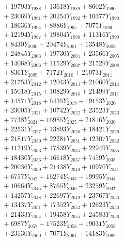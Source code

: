 \documentclass[a4paper,10pt]{article}
\begin{document}
{\begin{align}
&\;  + 19793 Y_{1988} + 13618 Y_{1989} + 8602 Y_{1990} \\[0.3ex]
&\;  + 23069 Y_{1991} + 20254 Y_{1992} + 10377 Y_{1993} \\[0.3ex]
&\;  + 18636 Y_{1994} + 8886 Y_{1995} + 7075 Y_{1996} \\[0.3ex]
&\;  + 12194 Y_{1997} + 19804 Y_{1998} + 11316 Y_{1999} \\[0.3ex]
&\;  + 8430 Y_{2000} + 20474 Y_{2001} + 13548 Y_{2002} \\[0.3ex]
&\;  + 24845 Y_{2003} + 19730 Y_{2004} + 23566 Y_{2005} \\[0.3ex]
&\;  + 14068 Y_{2006} + 11529 Y_{2007} + 21529 Y_{2008} \\[0.5ex]\allowbreak
&\;  + 8361 Y_{2009} + 7172 Y_{2010} + 21073 Y_{2011} \\[0.3ex]
&\;  + 21753 Y_{2012} + 12043 Y_{2013} + 21060 Y_{2014} \\[0.3ex]
&\;  + 15018 Y_{2015} + 10829 Y_{2016} + 21499 Y_{2017} \\[0.3ex]
&\;  + 14571 Y_{2018} + 6435 Y_{2019} + 19153 Y_{2020} \\[0.3ex]
&\;  + 23005 Y_{2021} + 10742 Y_{2022} + 23523 Y_{2023} \\[0.3ex]
&\;  + 7738 Y_{2024} + 16985 Y_{2025} + 21816 Y_{2026} \\[0.3ex]
&\;  + 22531 Y_{2027} + 13893 Y_{2028} + 18421 Y_{2029} \\[0.3ex]
&\;  + 21817 Y_{2030} + 22281 Y_{2031} + 12307 Y_{2032} \\[0.3ex]
&\;  + 11219 Y_{2033} + 17839 Y_{2034} + 22949 Y_{2035} \\[0.3ex]
&\;  + 18430 Y_{2036} + 16618 Y_{2037} + 7459 Y_{2038} \\[0.5ex]\allowbreak
&\;  + 20036 Y_{2039} + 21438 Y_{2040} + 10970 Y_{2041} \\[0.3ex]
&\;  + 6757 Y_{2042} + 16274 Y_{2043} + 19995 Y_{2044} \\[0.3ex]
&\;  + 10664 Y_{2045} + 8765 Y_{2046} + 23259 Y_{2047} \\[0.3ex]
&\;  + 14257 Y_{2048} + 22697 Y_{2049} + 23767 Y_{2050} \\[0.3ex]
&\;  + 13437 Y_{2051} + 17352 Y_{2052} + 12623 Y_{2053} \\[0.3ex]
&\;  + 21433 Y_{2054} + 19458 Y_{2055} + 24583 Y_{2056} \\[0.3ex]
&\;  + 6987 Y_{2057} + 17523 Y_{2058} + 19031 Y_{2059} \\[0.3ex]
&\;  + 23130 Y_{2060} + 7071 Y_{2061} + 14183 Y_{2062} \\[0.3ex]

\end{align}}
\end{document}
